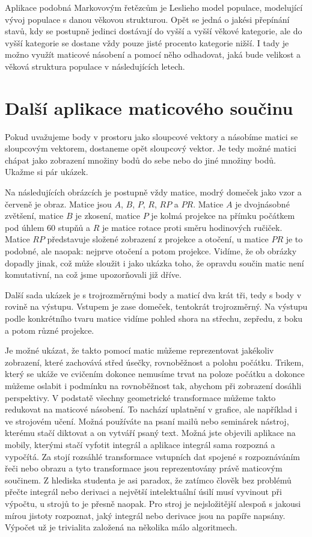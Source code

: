 \documentclass[12pt]{article}
\begin{document}
Aplikace podobná Markovovým řetězcům je Leslieho model populace, modelující vývoj populace s danou věkovou strukturou. Opět se jedná o jakési přepínání stavů, kdy se postupně jedinci dostávají do vyšší a vyšší věkové kategorie, ale do vyšší kategorie se dostane vždy pouze jisté procento kategorie nižší. I tady je možno využít maticové násobení a pomocí něho odhadovat, jaká bude velikost a věková struktura populace v následujících letech.

\section{Další aplikace maticového součinu}

Pokud uvažujeme body v prostoru jako sloupcové vektory a násobíme matici se sloupcovým vektorem, dostaneme opět sloupcový vektor. Je tedy možné matici chápat jako zobrazení množiny bodů do sebe nebo do jiné množiny bodů. Ukažme si pár ukázek.

Na následujících obrázcích je postupně vždy matice, modrý domeček jako vzor a červeně je obraz. Matice jsou $A$, $B$, $P$, $R$, $RP$ a $PR$. Matice $A$ je dvojnásobné zvětšení, matice $B$ je zkosení, matice $P$ je kolmá projekce na přímku počátkem pod úhlem $60$ stupňů a $R$ je matice rotace proti směru hodinových ručiček. Matice $RP$ představuje složené zobrazení z projekce a otočení, u matice $PR$ je to podobné, ale naopak: nejprve otočení a potom projekce. Vidíme, že ob obrázky dopadly jinak, což může sloužit i jako ukázka toho, že opravdu součin matic není komutativní, na což jsme upozorňovali již dříve.  

Další sada ukázek je s trojrozměrnými body a maticí dva krát tři, tedy s body v rovině na výstupu. Vstupem je zase domeček, tentokrát trojrozměrný. Na výstupu podle konkrétního tvaru matice vidíme pohled shora na střechu, zepředu, z boku a potom různé projekce.

Je možné ukázat, že takto pomocí matic můžeme reprezentovat jakékoliv zobrazení, které zachovává střed úsečky, rovnoběžnost a polohu počátku. Trikem, který se ukáže ve cvičením dokonce nemusíme trvat na poloze počátku a dokonce můžeme oslabit i podmínku na rovnoběžnost tak, abychom při zobrazení dosáhli perspektivy. V podstatě všechny geometrické transformace můžeme takto redukovat na maticové násobení. To nachází uplatnění v grafice, ale například i ve strojovém učení. Možná používáte na psaní mailů nebo seminárek nástroj, kterému stačí diktovat a on vytváří psaný text. Možná jste objevili aplikace na mobily, kterými stačí vyfotit integrál a aplikace integrál sama rozpozná a vypočítá. Za stojí rozsáhlé transformace vstupních dat spojené s rozpoznáváním řeči nebo obrazu a tyto transformace jsou reprezentovány právě maticovým součinem. Z hlediska studenta je asi paradox, že zatímco člověk bez problémů přečte integrál nebo derivaci a největší intelektuální úsilí musí vyvinout při výpočtu, u strojů to je přesně naopak. Pro stroj je nejsložitější alespoň s jakousi mírou jistoty rozpoznat, jaký integrál nebo derivace jsou na papíře napsány. Výpočet už je trivialita založená na několika málo algoritmech. 
\end{document}

